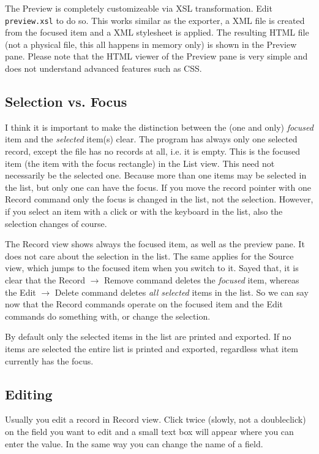 \documentclass[oneside,10pt]{article}
\begin{document}
The Preview is completely customizeable via XSL transformation. Edit \verb|preview.xsl|
to do so. This works similar as the exporter, a XML file is created from the focused
item and a XML stylesheet is applied. The resulting HTML file (not a physical file,
this all happens in memory only) is shown in the Preview pane. Please note that
the HTML viewer of the Preview pane is very simple and does not understand advanced
features such as CSS.

\subsection{Selection vs. Focus}
\label{sec:SelectionVsFocus}

I think it is important to make the distinction between the (one and only)
\emph{focused} item and the \emph{selected} item(s) clear. The program has always
only one selected record, except the file has no records at all, i.e. it is empty. This
is the focused item (the item with the focus rectangle) in the List
view. This need not necessarily be the selected one. Because more
than one items may be selected in the list, but only one can have the focus. If
you move the record pointer with one Record command only the focus is changed in
the list, not the selection. However, if you select an item with a click or with
the keyboard in the list, also the selection changes of course.

The Record view shows always the focused item, as well as the preview pane. It does not
care about the selection in the list. The same applies for the Source view, which
jumps to the focused item when you switch to it. Sayed that, it is clear that the
Record $\rightarrow$ Remove command deletes the \emph{focused} item, whereas the
Edit $\rightarrow$ Delete command deletes \emph{all selected} items in the list.
So we can say now that the Record commands operate on the focused item and the
Edit commands do something with, or change the selection.

By default only the selected items in the list are printed and
exported. If no items are selected the entire list is printed and
exported, regardless what item currently has the focus.

\subsection{Editing}
\label{sec:Editing}

Usually you edit a record in Record view. Click twice (slowly, not a doubleclick)
on the field you want to edit and a small text box will appear where you can enter
the value. In the same way you can change the name of a field.
\end{document}
